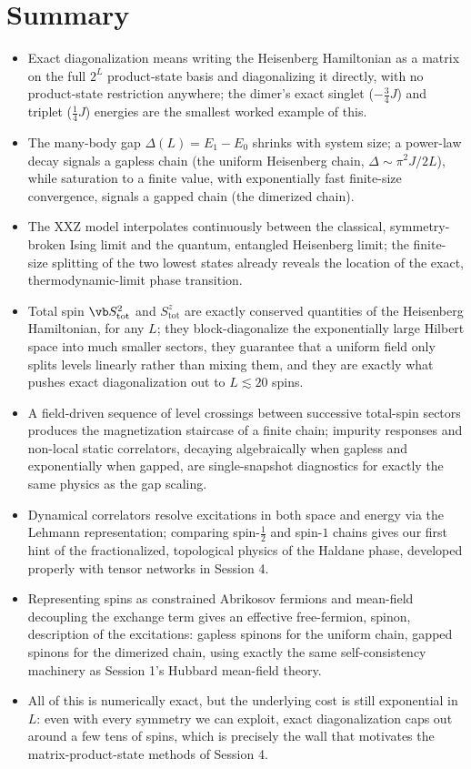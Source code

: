 \documentclass[all_sessions.tex]{subfiles}
\begin{document}
\section*{Summary}
\begin{itemize}[nosep]
  \item Exact diagonalization means writing the Heisenberg Hamiltonian as a matrix on the full $2^L$
    product-state basis and diagonalizing it directly, with no product-state restriction anywhere; the
    dimer's exact singlet ($-\tfrac34J$) and triplet ($\tfrac14J$) energies are the smallest worked
    example of this.
  \item The many-body gap $\Delta(L)=E_1-E_0$ shrinks with system size; a power-law decay signals a
    gapless chain (the uniform Heisenberg chain, $\Delta\sim\pi^2J/2L$), while saturation to a finite
    value, with exponentially fast finite-size convergence, signals a gapped chain (the dimerized chain).
  \item The XXZ model interpolates continuously between the classical, symmetry-broken Ising limit and
    the quantum, entangled Heisenberg limit; the finite-size splitting of the two lowest states already
    reveals the location of the exact, thermodynamic-limit phase transition.
  \item Total spin $\vb S_{\mathrm{tot}}^2$ and $S_{\mathrm{tot}}^z$ are exactly conserved quantities of
    the Heisenberg Hamiltonian, for any $L$; they block-diagonalize the exponentially large Hilbert
    space into much smaller sectors, they guarantee that a uniform field only splits levels linearly
    rather than mixing them, and they are exactly what pushes exact diagonalization out to
    $L\lesssim20$ spins.
  \item A field-driven sequence of level crossings between successive total-spin sectors produces the
    magnetization staircase of a finite chain; impurity responses and non-local static correlators, decaying
    algebraically when gapless and exponentially when gapped, are single-snapshot diagnostics for exactly
    the same physics as the gap scaling.
  \item Dynamical correlators resolve excitations in both space and energy via the Lehmann
    representation; comparing spin-$\tfrac12$ and spin-$1$ chains gives our first hint of the
    fractionalized, topological physics of the Haldane phase, developed properly with tensor networks in
    Session 4.
  \item Representing spins as constrained Abrikosov fermions and mean-field decoupling the exchange term
    gives an effective free-fermion, spinon, description of the excitations: gapless spinons for the
    uniform chain, gapped spinons for the dimerized chain, using exactly the same self-consistency
    machinery as Session 1's Hubbard mean-field theory.
  \item All of this is numerically exact, but the underlying cost is still exponential in $L$: even with
    every symmetry we can exploit, exact diagonalization caps out around a few tens of spins, which is
    precisely the wall that motivates the matrix-product-state methods of Session 4.
\end{itemize}
\end{document}
